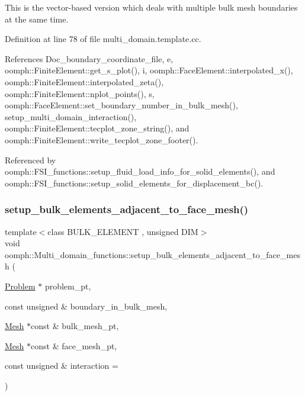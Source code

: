 This is the vector-\/based version which deals with multiple bulk mesh boundaries at the same time. 

Definition at line 78 of file multi\+\_\+domain.\+template.\+cc.



References Doc\+\_\+boundary\+\_\+coordinate\+\_\+file, e, oomph\+::\+Finite\+Element\+::get\+\_\+s\+\_\+plot(), i, oomph\+::\+Face\+Element\+::interpolated\+\_\+x(), oomph\+::\+Finite\+Element\+::interpolated\+\_\+zeta(), oomph\+::\+Finite\+Element\+::nplot\+\_\+points(), s, oomph\+::\+Face\+Element\+::set\+\_\+boundary\+\_\+number\+\_\+in\+\_\+bulk\+\_\+mesh(), setup\+\_\+multi\+\_\+domain\+\_\+interaction(), oomph\+::\+Finite\+Element\+::tecplot\+\_\+zone\+\_\+string(), and oomph\+::\+Finite\+Element\+::write\+\_\+tecplot\+\_\+zone\+\_\+footer().



Referenced by oomph\+::\+F\+S\+I\+\_\+functions\+::setup\+\_\+fluid\+\_\+load\+\_\+info\+\_\+for\+\_\+solid\+\_\+elements(), and oomph\+::\+F\+S\+I\+\_\+functions\+::setup\+\_\+solid\+\_\+elements\+\_\+for\+\_\+displacement\+\_\+bc().

\mbox{\label{namespaceoomph_1_1Multi__domain__functions_adcfac96ed755990c71f35b722bacbde7}} 
\subsubsection{\texorpdfstring{setup\+\_\+bulk\+\_\+elements\+\_\+adjacent\+\_\+to\+\_\+face\+\_\+mesh()}{setup\_bulk\_elements\_adjacent\_to\_face\_mesh()}\hspace{0.1cm}{\footnotesize\ttfamily [2/2]}}
{\footnotesize\ttfamily template$<$class B\+U\+L\+K\+\_\+\+E\+L\+E\+M\+E\+NT , unsigned D\+IM$>$ \\
void oomph\+::\+Multi\+\_\+domain\+\_\+functions\+::setup\+\_\+bulk\+\_\+elements\+\_\+adjacent\+\_\+to\+\_\+face\+\_\+mesh (\begin{DoxyParamCaption}\item[{\hyperlink{classoomph_1_1Problem}{Problem} $\ast$}]{problem\+\_\+pt,  }\item[{const unsigned \&}]{boundary\+\_\+in\+\_\+bulk\+\_\+mesh,  }\item[{\hyperlink{classoomph_1_1Mesh}{Mesh} $\ast$const \&}]{bulk\+\_\+mesh\+\_\+pt,  }\item[{\hyperlink{classoomph_1_1Mesh}{Mesh} $\ast$const \&}]{face\+\_\+mesh\+\_\+pt,  }\item[{const unsigned \&}]{interaction = {} }\end{DoxyParamCaption})}



